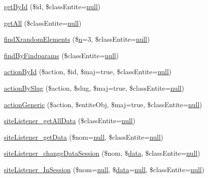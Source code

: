 \begin{DoxyCompactItemize}
\item 
\hyperlink{classentities_generic_a5f0a256216ada01d2e4885f72a99a17e}{get\+By\+Id} (\$id, \$class\+Entite=\hyperlink{validate_8js_afb8e110345c45e74478894341ab6b28e}{null})
\item 
\hyperlink{classentities_generic_a9f59548645b74b9490ad675a475817f5}{get\+All} (\$class\+Entite=\hyperlink{validate_8js_afb8e110345c45e74478894341ab6b28e}{null})
\item 
\hyperlink{classentities_generic_a371115c01089834bcccf5323541c8d88}{find\+Xrandom\+Elements} (\$\hyperlink{fullpage_2plugin_8min_8js_ab767a859d1217315f42c9bb52fc648dc}{n}=3, \$class\+Entite=\hyperlink{validate_8js_afb8e110345c45e74478894341ab6b28e}{null})
\item 
\hyperlink{classentities_generic_a053dc4397e0f6a228233866180e22f6d}{find\+By\+Findparams} (\$class\+Entite=\hyperlink{validate_8js_afb8e110345c45e74478894341ab6b28e}{null})
\item 
\hyperlink{classentities_generic_a5598d923299244b59b378d8273fbc340}{action\+By\+Id} (\$action, \$id, \$maj=true, \$class\+Entite=\hyperlink{validate_8js_afb8e110345c45e74478894341ab6b28e}{null})
\item 
\hyperlink{classentities_generic_af01562905d690594626c530f89919417}{action\+By\+Slug} (\$action, \$slug, \$maj=true, \$class\+Entite=\hyperlink{validate_8js_afb8e110345c45e74478894341ab6b28e}{null})
\item 
\hyperlink{classentities_generic_a88d83ab13a6bbcf96e12919cb9ed86a6}{action\+Generic} (\$action, \$entite\+Obj, \$maj=true, \$class\+Entite=\hyperlink{validate_8js_afb8e110345c45e74478894341ab6b28e}{null})
\item 
\hyperlink{classentities_generic_a81571a7e40fc550463637dc5e6fdd3fb}{site\+Listener\+\_\+get\+All\+Data} (\$class\+Entite=\hyperlink{validate_8js_afb8e110345c45e74478894341ab6b28e}{null})
\item 
\hyperlink{classentities_generic_ad097ed9b33f8d05140eb13a30b89162e}{site\+Listener\+\_\+get\+Data} (\$nom=\hyperlink{validate_8js_afb8e110345c45e74478894341ab6b28e}{null}, \$class\+Entite=\hyperlink{validate_8js_afb8e110345c45e74478894341ab6b28e}{null})
\item 
\hyperlink{classentities_generic_a7a8af463d232770ae8073f6ed3b4a459}{site\+Listener\+\_\+change\+Data\+Session} (\$nom, \$\hyperlink{fullpage_2plugin_8js_a718c1bf5a3bf21ebb980203b142e5b75}{data}, \$class\+Entite=\hyperlink{validate_8js_afb8e110345c45e74478894341ab6b28e}{null})
\item 
\hyperlink{classentities_generic_abb05438424ddbd20a4106fe7d4708ecf}{site\+Listener\+\_\+\+In\+Session} (\$nom=\hyperlink{validate_8js_afb8e110345c45e74478894341ab6b28e}{null}, \$\hyperlink{fullpage_2plugin_8js_a718c1bf5a3bf21ebb980203b142e5b75}{data}=\hyperlink{validate_8js_afb8e110345c45e74478894341ab6b28e}{null}, \$class\+Entite=\hyperlink{validate_8js_afb8e110345c45e74478894341ab6b28e}{null})

\end{DoxyCompactItemize}
